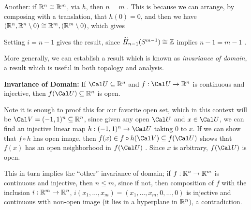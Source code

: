 \msk

Another: if ${\Bbb R}^n\cong {\Bbb R}^m$, via $h$, then $n=m$ .
This is because we can arrange, by composing with a translation, that $h(0)=0$, and then 
we have 
$({\Bbb R}^n,{\Bbb R}^n\setminus 0)\cong {\Bbb R}^m,({\Bbb R}^m\setminus 0)$, which gives


\ssk



\ssk

Setting $i=n-1$ gives the result, since $\widetilde{H}_{n-1}(S^{m-1})\cong {\Bbb Z}$ implies $n-1=m-1$ .

\msk

More generally, we can establish a result which is known as {\it invariance of domain},
a result which is useful in both topology and analysis.

\msk

{\bf Invariance of Domain:} If ${\Cal U}\subseteq {\Bbb R}^n$ and $f:{\Cal U}\ra {\Bbb R}^n$
is continuous and injective, then $f({\Cal U})\subseteq {\Bbb R}^n$ is open.

\msk

Note it is enough to proof this for our favorite open set, which in this context will be ${\Cal V}=(-1,1)^n\subseteq {\Bbb R}^n$,
since given any open ${\Cal U}$ and $x\in{\Cal U}$, we can find an injective linear map $h:(-1,1)^n\ra {\Cal U}$
taking $0$ to $x$. If we can show that $f\circ h$ has open image, then $f(x)\in f\circ h({\Cal V})\subseteq f({\Cal U})$
shows that $f(x)$ has an open neighborhood in $f({\Cal U})$ . Since $x$ is arbitrary, $f({\Cal U})$ is open.

\msk

\bsk

\msk

This in turn implies the ``other'' invariance of domain; if $f: {\Bbb R}^n\rightarrow {\Bbb R}^m$ is continuous and injective, then
$n\leq m$, since if not, then composition of $f$ with the inclusion $i:{\Bbb R}^m\rightarrow {\Bbb R}^n$, $i(x_1,\ldots ,x_m) = 
(x_1,\ldots ,x_m,0,\ldots ,0)$ is injective and continuous with non-open image (it lies in a hyperplane in ${\Bbb R}^n$),
a contradiction.


